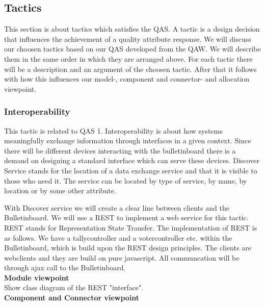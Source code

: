 \subsection{Tactics}
This section is about tactics which satisfies the QAS. A tactic is a design decision that influences the achievement of a quality attribute response. We will discuss our choosen tactics based on our QAS developed from the QAW. We will describe them in the same order in which they are arranged above. For each tactic there will be a description and an argument of the choosen tactic. After that it follows with how this influences our model-, component and connector- and allocation viewpoint. 


\noindent
\subsubsection{Interoperability}
This tactic is related to QAS 1. Interoperability is about how systems meaningfully exchange information through interfaces in a given context. Since there will be different devices interacting with the bulletinboard there is a demand on designing a standard interface which can serve these devices. Discover Service stands for the location of a data exchange service and that it is visible to those who need it. The service can be located by type of service, by name, by location or by some other attribute.


\begin{center}
\end{center}


\noindent
With Discover service we will create a clear line between clients and the Bulletinboard. We will use a REST to implement a web service for this tactic.\\

\noindent
REST stands for Representation State Transfer. The implementation of REST is as follows. We have a tallycontroller and a votercontroller etc. within the Bulletinboard, which is build upon the REST design principles. The clients are webclients and they are build on pure javascript. All communcation will be through ajax call to the Bulletinboard.\\


\noindent
\textbf{Module viewpoint}\\
Show class diagram of the REST "interface".\\

\noindent
\textbf{Component and Connector viewpoint}\\

